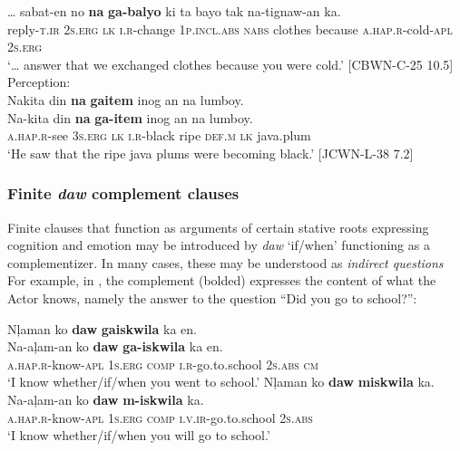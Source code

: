 \gll … sabat-en  no  \textbf{na}  \textbf{ga-balyo}  ki  ta  bayo tak  na-tignaw-an  ka. \\
{} reply-\textsc{t.ir}  2\textsc{s.erg}  \textsc{lk}  \textsc{i.r}-change  1\textsc{p.incl.abs}  \textsc{nabs}  clothes
because  \textsc{a.hap.r}-cold-\textsc{apl}  2\textsc{s.erg} \\
\glt ‘… answer that we exchanged clothes because you were cold.’ [CBWN-C-25 10.5]
\z
\ea
Perception: \\
Nakita  din  \textbf{na}  \textbf{gaitem}  inog  an  na  lumboy. \smallskip\\
\gll Na-kita  din  \textbf{na}  \textbf{ga-item}  inog  an  na  lumboy. \\
\textsc{a.hap.r}-see  3\textsc{s.erg}  \textsc{lk}  \textsc{i.r}-black  ripe  \textsc{def.m}  \textsc{lk}  java.plum \\
\glt ‘He saw that the ripe java plums were becoming black.’ [JCWN-L-38 7.2]
\z

\subsubsection{Finite \textit{daw} complement clauses}

Finite clauses that function as arguments of certain stative roots expressing cognition and emotion may be introduced by \textit{daw} `if/when' functioning as a complementizer. In many cases, these may be understood as \textit{indirect questions} For example, in , the complement (bolded) expresses the content of what the Actor knows, namely the answer to the question “Did you go to school?”:

\ea
\label{bkm:Ref472922620}
Nļaman  ko  \textbf{daw}  \textbf{gaiskwila}  ka  en. \smallskip\\
\gll Na-aļam-an  ko  \textbf{daw}  \textbf{ga-iskwila}  ka  en. \\
\textsc{a.hap.r}-know-\textsc{apl}  1\textsc{s.erg}  \textsc{comp}  \textsc{i.r}-go.to.school  2\textsc{s.abs}  \textsc{cm} \\
\glt ‘I know whether/if/when you went to school.’
\z
\ea
Nļaman  ko    \textbf{daw}  \textbf{miskwila}  ka. \smallskip\\
\gll Na-aļam-an  ko    \textbf{daw}  \textbf{m-iskwila}  ka. \\
\textsc{a.hap.r}-know-\textsc{apl}  1\textsc{s.erg}    \textsc{comp}  \textsc{i.v.ir}-go.to.school  2\textsc{s.abs} \\
\glt ‘I know whether/if/when you will go to school.’
\z

